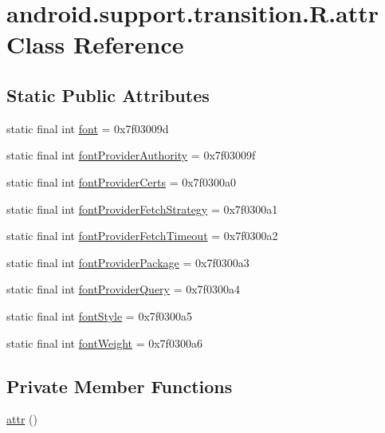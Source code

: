 \hypertarget{classandroid_1_1support_1_1transition_1_1_r_1_1attr}{}\section{android.\+support.\+transition.\+R.\+attr Class Reference}
\label{classandroid_1_1support_1_1transition_1_1_r_1_1attr}
\subsection*{Static Public Attributes}
\begin{DoxyCompactItemize}
\item 
static final int \mbox{\hyperlink{classandroid_1_1support_1_1transition_1_1_r_1_1attr_a03e0b314e887f913bd1270d40202af3d}{font}} = 0x7f03009d
\item 
static final int \mbox{\hyperlink{classandroid_1_1support_1_1transition_1_1_r_1_1attr_aca519f1967d5768069bf7355f3029826}{font\+Provider\+Authority}} = 0x7f03009f
\item 
static final int \mbox{\hyperlink{classandroid_1_1support_1_1transition_1_1_r_1_1attr_a283a0f3186dbb719581e4c09bd9fa0e0}{font\+Provider\+Certs}} = 0x7f0300a0
\item 
static final int \mbox{\hyperlink{classandroid_1_1support_1_1transition_1_1_r_1_1attr_ace530c6e0295a3d81d4bdbb53cd9448a}{font\+Provider\+Fetch\+Strategy}} = 0x7f0300a1
\item 
static final int \mbox{\hyperlink{classandroid_1_1support_1_1transition_1_1_r_1_1attr_aff85f778cf905c9272b7f44512c8f106}{font\+Provider\+Fetch\+Timeout}} = 0x7f0300a2
\item 
static final int \mbox{\hyperlink{classandroid_1_1support_1_1transition_1_1_r_1_1attr_af0b488678f459c82a364c3d556f006e7}{font\+Provider\+Package}} = 0x7f0300a3
\item 
static final int \mbox{\hyperlink{classandroid_1_1support_1_1transition_1_1_r_1_1attr_acf825a0417d1c4ddf5cbd6794c986310}{font\+Provider\+Query}} = 0x7f0300a4
\item 
static final int \mbox{\hyperlink{classandroid_1_1support_1_1transition_1_1_r_1_1attr_a36ada44c5dc7ab2aa0181a77dc193748}{font\+Style}} = 0x7f0300a5
\item 
static final int \mbox{\hyperlink{classandroid_1_1support_1_1transition_1_1_r_1_1attr_a48e029a9c276df99715bd535d194d2ff}{font\+Weight}} = 0x7f0300a6
\end{DoxyCompactItemize}
\subsection*{Private Member Functions}
\begin{DoxyCompactItemize}
\item 
\mbox{\hyperlink{classandroid_1_1support_1_1transition_1_1_r_1_1attr_a99e46683fea0c772eeffe3ecdf368ee2}{attr}} ()
\end{DoxyCompactItemize}


